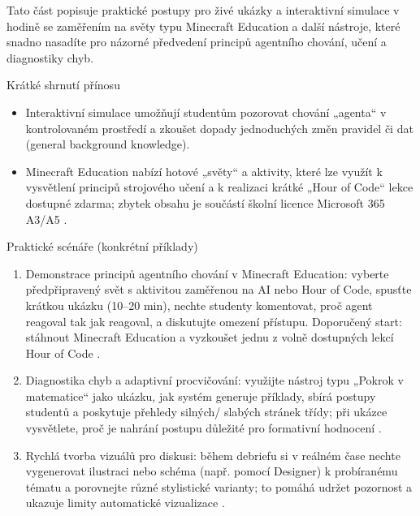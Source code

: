 Tato část popisuje praktické postupy pro živé ukázky a interaktivní simulace v hodině se zaměřením na světy typu Minecraft Education a další nástroje, které snadno nasadíte pro názorné předvedení principů agentního chování, učení a diagnostiky chyb.

Krátké shrnutí přínosu
\begin{itemize}
  \item Interaktivní simulace umožňují studentům pozorovat chování „agenta“ v kontrolovaném prostředí a zkoušet dopady jednoduchých změn pravidel či dat (general background knowledge).
  \item Minecraft Education nabízí hotové „světy“ a aktivity, které lze využít k vysvětlení principů strojového učení a k realizaci krátké „Hour of Code“ lekce dostupné zdarma; zbytek obsahu je součástí školní licence Microsoft 365 A3/A5 \cite{kb_ai_101_tipu_pdf_04e4a115_page_15_2}.
\end{itemize}

Praktické scénáře (konkrétní příklady)
\begin{enumerate}
  \item Demonstrace principů agentního chování v Minecraft Education: vyberte předpřipravený svět s aktivitou zaměřenou na AI nebo Hour of Code, spusťte krátkou ukázku (10--20 min), nechte studenty komentovat, proč agent reagoval tak jak reagoval, a diskutujte omezení přístupu. Doporučený start: stáhnout Minecraft Education a vyzkoušet jednu z volně dostupných lekcí Hour of Code \cite{kb_ai_101_tipu_pdf_04e4a115_page_15_2}.
  \item Diagnostika chyb a adaptivní procvičování: využijte nástroj typu „Pokrok v matematice“ jako ukázku, jak systém generuje příklady, sbírá postupy studentů a poskytuje přehledy silných/ slabých stránek třídy; při ukázce vysvětlete, proč je nahrání postupu důležité pro formativní hodnocení \cite{kb_ai_101_tipu_pdf_04e4a115_page_8_1}.
  \item Rychlá tvorba vizuálů pro diskusi: během debriefu si v reálném čase nechte vygenerovat ilustraci nebo schéma (např. pomocí Designer) k probíranému tématu a porovnejte různé stylistické varianty; to pomáhá udržet pozornost a ukazuje limity automatické vizualizace \cite{kb_ai_101_tipu_pdf_04e4a115_page_51_1}.
\end{enumerate}

